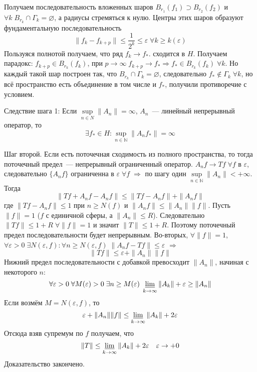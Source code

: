 \documentclass[14pt]{extarticle}
\begin{document}
\begin{Proof}
    Получаем последовательность вложенных шаров $B_{r_1}(f_1) \supset B_{r_2}(f_2)$ и $\forall k\; B_{r_k} \cap \Gamma_k = \varnothing$, а радиусы стремяться к нулю.
    Центры этих шаров образуют фундаментальную последовательность
    $$
    \|f_k - f_{k + p}\| \le \dfrac{1}{2^k} \le \varepsilon\; \forall k \ge k(\varepsilon)
    $$
    Пользуяся полнотой получаем, что ряд $f_k \to f_*$. сходится в $H$.
    Получаем парадокс: $f_{k+p} \in B_{r_k}(f_k)$, при $p \to \infty\; f_{k+p} \to f_* \Rightarrow  f_* \in B_{r_k}(f_k)\; \forall k$.
    Но каждый такой шар построен так, что $B_{r_k} \cap \Gamma_k = \varnothing$, следовательно $f_* \notin \Gamma_k\; \forall k$, но всё пространство есть объединение
    в том числе и $f_*$, получили противоречие с условием.

    Следствие шага 1: Если $\sup\limits_{n \in N}\|A_n\| = \infty$, $A_n$~--- линейный непрерывный оператор, то 
    $$\exists f_* \in H\colon
    \sup \limits_{n \in \mathbb N}\|A_n f_*\| = \infty
    $$

    Шаг второй. Если есть поточечная сходимость из полного пространства, то тогда поточечный предел~--- непрерывный ограниченный оператор.
    $A_n f \to T f\; \forall f$ в $\varepsilon$, следовательно $\{A_n f\}$ ограниченна в $\varepsilon\; \forall f\; \Rightarrow$ по шагу один $\sup \limits_{n \in
    \mathbb N}\|A_n\| < +\infty$.
    Тогда 
    $$
    \|Tf + A_n f - A_n f\| \le \|Tf - A_n f\| + \|A_n f\|
    $$
     где $\|Tf - A_n f\| \le 1$ при $n \ge N(f)$ и $\|A_n f\| \le \|A_n\| \|f\|$. 
     Пусть $\|f\| = 1$ ($f$ с
    единичной сферы, а $\|A_n\| \le R$).
    Следовательно $\|Tf\| \le 1 + R\; \forall \|f\| = 1$ и значит $\|T\| \le 1 + R$.
    Поэтому поточечный предел последовательности будет непрерывным.
    Во-вторых, $\forall \|f\| = 1$, $\forall \varepsilon > 0\; \exists N(\varepsilon, f)\colon \forall n \ge N(\varepsilon, f)\; \|A_n f - Tf\| \le \varepsilon$
    $\Rightarrow$
    $$
    \|Tf\| \le \varepsilon + \|A_n\|\|f\|
    $$
    Нижний предел последовательности с добавкой превосходит $\|A_n\|$, начиная с некоторого $n$:
    $$
    \forall \varepsilon > 0\; \forall M(\varepsilon) > 0\; \exists n \ge M(\varepsilon)\; \varliminf\limits_{k \to \infty}\|A_k\| + \varepsilon \ge \|A_n\|
    $$
    Если возмём $M = N(\varepsilon, f)$, то 
    $$
    \varepsilon + \|A_n\| \|f\| \le \varliminf\limits_{k \to \infty}\|A_k\| + 2 \varepsilon
    $$
    Отсюда взяв супремум по $f$ получаем, что 
    $$
    \|T\| \le \varliminf\limits_{k \to \infty}\|A_k\| + 2 \varepsilon\quad \varepsilon \to +0
    $$
    Доказательство закончено.
\end{Proof}
\end{document}
